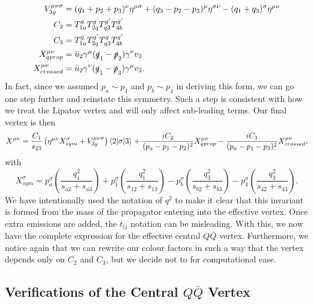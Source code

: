 \begin{subequations}
\begin{align}
V_{3g}^{\mu \nu \sigma} &= (q_1 + p_2 + p_3)^\nu \eta^{\mu \sigma} + (q_3 - p_2 -p_3)^\mu \eta^{\sigma \nu} - (q_1 + q_3)^\sigma \eta^{\mu \nu} \\
C_2 &= T^g_{1a}T^g_{2q}T^{g'}_{q3}T^{g'}_{4b} \\
C_3 &= T^g_{1a}T^{g'}_{2q}T^g_{q3}T^{g'}_{4b} \\
X_{qprop}^{\mu \nu} &= \bar{u}_2 \gamma^\mu (\slashed{q}_1 - \slashed{p}_2)\gamma^\nu v_3 \\
X_{crossed}^{\mu \nu} &=\bar{u}_2 \gamma^\nu (\slashed{q}_1 - \slashed{p}_3)\gamma^\mu v_3.
\end{align}
\end{subequations}
In fact, since we assumed $p_a \sim p_1$ and $p_b \sim p_4$ in deriving this form, we can go one step further and reinstate this symmetry. Such a step is consistent with how we treat the Lipatov vertex and will only affect sub-leading terms. Our final vertex is then
\begin{equation}
X^{\mu \nu} = \frac{C_1}{s_{23}} \left(\eta^{\mu \nu} X_{sym}^\sigma + V^{\mu \nu \sigma}_{3g} \right) \mathinner{\langle2\vert\sigma\vert3\rangle}_{} + \frac{i C_2}{(p_a-p_1-p_2)^2} X^{\mu \nu}_{qprop} - \frac{i C_3}{(p_a-p_1-p_3)^2} X^{\mu \nu}_{crossed},
\end{equation}
with
\begin{equation}
X_{sym}^\sigma = p_a^\sigma \left( \frac{q_1^2}{s_{a2}+s_{a3}} \right) + p_1^\sigma \left( \frac{q_1^2}{s_{12}+s_{13}} \right) 
- p_b^\sigma \left( \frac{q_3^2}{s_{b2}+s_{b3}} \right) - p_4^\sigma \left( \frac{q_3^2}{s_{42}+s_{43}} \right).
\end{equation}
We have intentionally used the notation of $q^2$ to make it clear that this invariant is formed from the mass of the propagator entering into the effective vertex. Once extra emissions are added, the $t_{ij}$ notation can be misleading. With this, we now have the complete expression for the effective central $Q\bar{Q}$ vertex. Furthermore, we notice again that we can rewrite our colour factors in such a way that the vertex depends only on $C_2$ and $C_3$, but we decide not to for computational ease. 

\subsection{Verifications of the Central $Q\bar{Q}$ Vertex}

